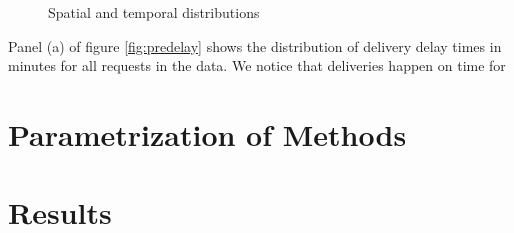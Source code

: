 \begin{figure}[h]
	\centering
	\caption{Spatial and temporal distributions}
	\label{fig:prepdelay}
\end{figure}

Panel (a) of figure \ref{fig:predelay} shows the distribution of delivery delay times in minutes for all requests in the data. We notice that deliveries happen on time for 


 
\section{Parametrization of Methods}

\section{Results}







